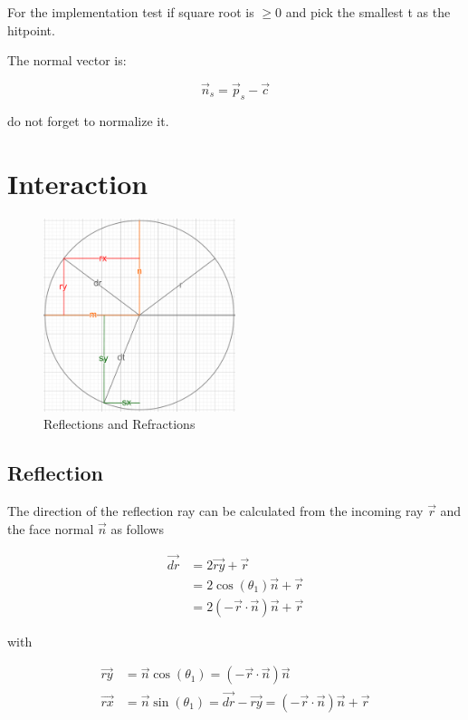 \documentclass[11pt,a4paper,oneside]{article}
\begin{document}
For the implementation test if square root is $\geqslant 0$ and pick the smallest t as the hitpoint.

The normal vector is:

\begin{equation}
\vec{n}_s = \vec{p}_s - \vec{c}
\end{equation}

do not forget to normalize it.


\section{Interaction}

\begin{figure}[!htb]
\begin{minipage}[t]{1\linewidth}
\centering
\includegraphics[width=0.5\textwidth]{./Images/reflect_refract.jpg}
\caption{Reflections and Refractions}
\label{fig:A}
\end{minipage}
\end{figure}

\subsection{Reflection}

The direction of the reflection ray can be calculated from the incoming ray $\vec{r}$ and the face normal $\vec{n}$ as follows

\begin{align}
\vec{dr} &= 2 \vec{ry} + \vec{r}\\
&= 2 \cos(\theta_1) \vec{n} + \vec{r}\\
&= 2 (-\vec{r} \cdot \vec{n}) \vec{n} + \vec{r}
\end{align}

with

\begin{align}
\vec{ry} &= \vec{n} \cos(\theta_1) = ( -\vec{r} \cdot \vec{n} ) \vec{n} \\
\vec{rx} &= \vec{n} \sin(\theta_1) = \vec{dr} - \vec{ry} = (-\vec{r} \cdot \vec{n}) \vec{n} + \vec{r} \\
\end{align}
\end{document}
